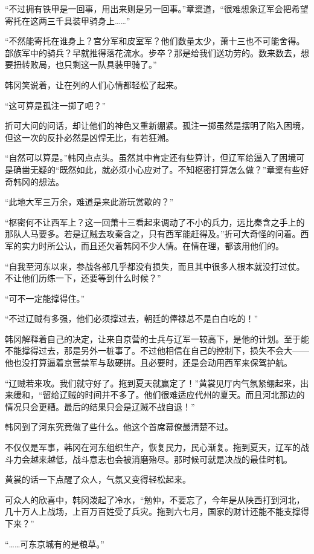 “不过拥有铁甲是一回事，用出来则是另一回事。”章楶道，“很难想象辽军会把希望寄托在这两三千具装甲骑身上……”

“不然能寄托在谁身上？宫分军和皮室军？他们数量太少，萧十三也不可能舍得。部族军中的骑兵？早就推得落花流水。步卒？那是给我们送功劳的。数来数去，想要扭转败局，也只剩这一队具装甲骑了。”

韩冈笑说着，让在列的人们心情都轻松了起来。

“这可算是孤注一掷了吧？”

折可大问的问话，却让他们的神色又重新绷紧。孤注一掷虽然是摆明了陷入困境，但这一次的反扑必然是凶悍无比，有若狂潮。

“自然可以算是。”韩冈点点头。虽然其中肯定还有些算计，但辽军给逼入了困境可是确凿无疑的“既然如此，就必须小心应对了。不知枢密打算怎么做？”章楶有些好奇韩冈的想法。

“此地大军三万余，难道是来此游玩赏歇的？”

“枢密何不让西军上？这一回萧十三看起来调动了不小的兵力，远比秦含之手上的那队人马要多。若是辽贼去攻秦含之，只有西军能赶得及。”折可大奇怪的问着。西军的实力时所公认，而且还欠着韩冈不少人情。在情在理，都该用他们的。

“自我至河东以来，参战各部几乎都没有损失，而且其中很多人根本就没打过仗。不让他们历练一下，还要等到什么时候？”

“可不一定能撑得住。”

“不过辽贼有多强，他们必须撑过去，朝廷的俸禄总不是白白吃的！”

韩冈解释着自己的决定，让来自京营的士兵与辽军一较高下，是他的计划。至于能不能撑得过去，那是另外一桩事了。不过他相信在自己的控制下，损失不会大——他也没打算逼着京营禁军与敌硬拼。且必要时，还是会动用西军来保驾护航。

“辽贼若来攻。我们就守好了。拖到夏天就赢定了！”黄裳见厅内气氛紧绷起来，出来缓和，“留给辽贼的时间并不多了。他们很难适应代州的夏天。而且河北那边的情况只会更糟。最后的结果只会是辽贼不战自退！”

韩冈到了河东究竟做了些什么。他这个首席幕僚最清楚不过。

不仅仅是军事，韩冈在河东组织生产，恢复民力，民心渐复。拖到夏天，辽军的战斗力会越来越低，战斗意志也会被消磨殆尽。那时候可就是决战的最佳时机。

黄裳的话一下点醒了众人，气氛又变得轻松起来。

可众人的欣喜中，韩冈泼起了冷水，“勉仲，不要忘了，今年是从陕西打到河北，几十万人上战场，上百万百姓受了兵灾。拖到六七月，国家的财计还能不能支撑得下来？”

“……可东京城有的是粮草。”

